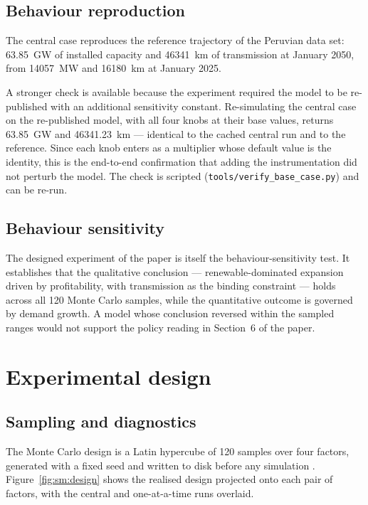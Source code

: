 \documentclass[11pt]{article}
\begin{document}
\subsection{Behaviour reproduction}

The central case reproduces the reference trajectory of the Peruvian data set:
\SI{63.85}{\giga\watt} of installed capacity and \SI{46341}{\kilo\meter} of
transmission at January 2050, from \SI{14057}{\mega\watt} and
\SI{16180}{\kilo\meter} at January 2025.

A stronger check is available because the experiment required the model to be
re-published with an additional sensitivity constant. Re-simulating the central case
on the re-published model, with all four knobs at their base values, returns
\SI{63.85}{\giga\watt} and \SI{46341.23}{\kilo\meter} --- identical to the cached
central run and to the reference. Since each knob enters as a multiplier whose
default value is the identity, this is the end-to-end confirmation that adding the
instrumentation did not perturb the model. The check is scripted
(\texttt{tools/verify\_base\_case.py}) and can be re-run.

\subsection{Behaviour sensitivity}

The designed experiment of the paper is itself the behaviour-sensitivity test. It
establishes that the qualitative conclusion --- renewable-dominated expansion
driven by profitability, with transmission as the binding constraint --- holds
across all 120 Monte Carlo samples, while the quantitative outcome is governed by
demand growth. A model whose conclusion reversed within the sampled ranges would not
support the policy reading in Section~6 of the paper.

\section{Experimental design}
\label{sm:design}

\subsection{Sampling and diagnostics}

The Monte Carlo design is a Latin hypercube of 120 samples over four factors,
generated with a fixed seed and written to disk before any simulation
\citep{mckay1992}. Figure~\ref{fig:sm:design} shows the realised design projected
onto each pair of factors, with the central and one-at-a-time runs overlaid.
\end{document}
